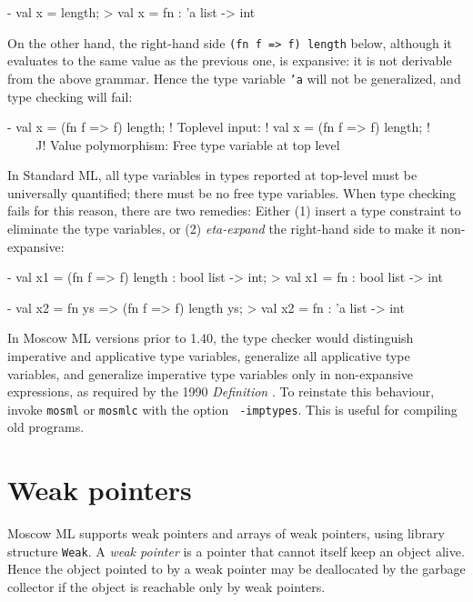 \documentclass[fleqn]{article}
\begin{document}
\begin{program}
- val x = length;
> val x = fn : 'a list -> int 
\end{program}

\noindent On the other hand, the right-hand side {\tt (fn f => f)
  length} below, although it evaluates to the same value as the
previous one, is expansive: it is not derivable from the above
grammar.  Hence the type variable {\tt 'a} will not be generalized,
and type checking will fail:

\begin{program}
- val x = (fn f => f) length;
! Toplevel input:
! val x = (fn f => f) length;
! ^^^^^^^^^^^^^^^^^^^^^^^^^^
! Value polymorphism: Free type variable at top level
\end{program}

\noindent In Standard ML, all type variables in types reported at
top-level must be universally quantified; there must be no free type
variables.  When type checking fails for this reason, there are two
remedies: Either (1) insert a type constraint to eliminate the type
variables, or (2) {\em eta-expand\/} the right-hand side to make it
non-expansive:

\begin{program}
- val x1 = (fn f => f) length : bool list -> int;
> val x1 = fn : bool list -> int

- val x2 = fn ys => (fn f => f) length ys;
> val x2 = fn : 'a list -> int    
\end{program}

\noindent In Moscow ML versions prior to 1.40, the type checker would
distinguish imperative and applicative type variables, generalize all
applicative type variables, and generalize imperative type variables
only in non-expansive expressions, as required by the 1990 {\em
  Definition\/} \cite{Milner:1990:TheDefinition}.  To reinstate this
behaviour, invoke {\tt mosml} or {\tt mosmlc} with the option {\tt
  -imptypes}.  This is useful for compiling old programs.

\newpage


\section{Weak pointers}
\label{sec-weak-pointers}

Moscow ML supports weak pointers and arrays of weak pointers, using
library structure {\tt Weak}.  A {\em weak pointer\/} is a pointer
that cannot itself keep an object alive.  Hence the object pointed to
by a weak pointer may be deallocated by the garbage collector if the
object is reachable only by weak pointers.
\end{document}
